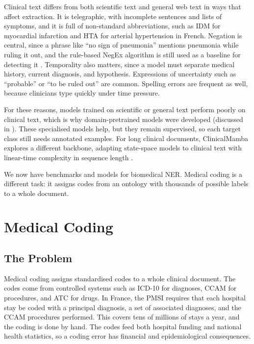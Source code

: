 Clinical text differs from both scientific text and general web text in ways that affect
extraction. It is telegraphic, with incomplete sentences and lists of symptoms, and it is full
of non-standard abbreviations, such as IDM for myocardial infarction and HTA for arterial
hypertension in French. Negation is central, since a phrase like ``no sign of pneumonia''
mentions pneumonia while ruling it out, and the rule-based NegEx algorithm is still used as a
baseline for detecting it \citep{chapman2001negex}. Temporality also matters, since a model
must separate medical history, current diagnosis, and hypothesis. Expressions of
uncertainty such as ``probable'' or ``to be ruled out'' are common. Spelling errors are
frequent as well, because clinicians type quickly under time pressure.

For these reasons, models trained on scientific or general text perform poorly on clinical
text, which is why domain-pretrained models were developed (discussed in
). These specialised models help, but they remain supervised, so each
target class still needs annotated examples. For long clinical documents, ClinicalMamba
explores a different backbone, adapting state-space models to clinical text with linear-time
complexity in sequence length \citep{yang2024clinicalmamba}.

We now have benchmarks and models for biomedical NER. Medical coding is a different task: it
assigns codes from an ontology with thousands of possible labels to a whole document.
\section{Medical Coding}
\label{sec:ie-coding}

\subsection{The Problem}

Medical coding assigns standardised codes to a whole clinical document. The codes come from
controlled systems such as ICD-10 for diagnoses, CCAM for procedures, and ATC for drugs. In
France, the PMSI requires that each hospital stay be coded with a principal diagnosis, a set of
associated diagnoses, and the CCAM procedures performed. This covers tens of millions of stays a
year, and the coding is done by hand. The codes feed both hospital funding and national health
statistics, so a coding error has financial and epidemiological consequences.


